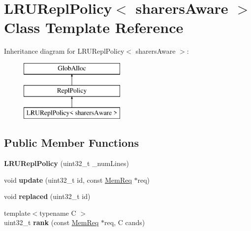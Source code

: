 \hypertarget{classLRUReplPolicy}{\section{L\-R\-U\-Repl\-Policy$<$ sharers\-Aware $>$ Class Template Reference}
\label{classLRUReplPolicy}
}
Inheritance diagram for L\-R\-U\-Repl\-Policy$<$ sharers\-Aware $>$\-:\begin{figure}[H]
\begin{center}
\leavevmode
\includegraphics[height=3.000000cm]{classLRUReplPolicy}
\end{center}
\end{figure}
\subsection*{Public Member Functions}
\begin{DoxyCompactItemize}
\item 
\hypertarget{classLRUReplPolicy_a5b56dfdf924617f38a9ce0c40eee4531}{{\bfseries L\-R\-U\-Repl\-Policy} (uint32\-\_\-t \-\_\-num\-Lines)}\label{classLRUReplPolicy_a5b56dfdf924617f38a9ce0c40eee4531}

\item 
\hypertarget{classLRUReplPolicy_a8f0aaeb531fb610a3411b986904de164}{void {\bfseries update} (uint32\-\_\-t id, const \hyperlink{structMemReq}{Mem\-Req} $\ast$req)}\label{classLRUReplPolicy_a8f0aaeb531fb610a3411b986904de164}

\item 
\hypertarget{classLRUReplPolicy_a86764b8fbec69f372916587021fc03e0}{void {\bfseries replaced} (uint32\-\_\-t id)}\label{classLRUReplPolicy_a86764b8fbec69f372916587021fc03e0}

\item 
\hypertarget{classLRUReplPolicy_a1fc2a785e3066a2f6aa1a19c13451f8e}{{\footnotesize template$<$typename C $>$ }\\uint32\-\_\-t {\bfseries rank} (const \hyperlink{structMemReq}{Mem\-Req} $\ast$req, C cands)}\label{classLRUReplPolicy_a1fc2a785e3066a2f6aa1a19c13451f8e}

\end{DoxyCompactItemize}
